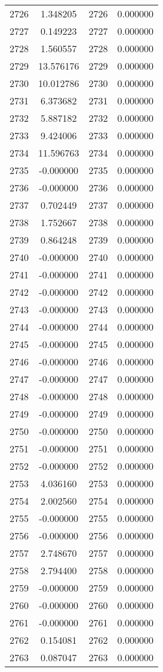 \documentclass[12pt]{article}
\begin{document}
\begin{longtable}{@{}cccc@{}}
2726 & 1.348205 & 2726 & 0.000000 \\
2727 & 0.149223 & 2727 & 0.000000 \\
2728 & 1.560557 & 2728 & 0.000000 \\
2729 & 13.576176 & 2729 & 0.000000 \\
2730 & 10.012786 & 2730 & 0.000000 \\
2731 & 6.373682 & 2731 & 0.000000 \\
2732 & 5.887182 & 2732 & 0.000000 \\
2733 & 9.424006 & 2733 & 0.000000 \\
2734 & 11.596763 & 2734 & 0.000000 \\
2735 & -0.000000 & 2735 & 0.000000 \\
2736 & -0.000000 & 2736 & 0.000000 \\
2737 & 0.702449 & 2737 & 0.000000 \\
2738 & 1.752667 & 2738 & 0.000000 \\
2739 & 0.864248 & 2739 & 0.000000 \\
2740 & -0.000000 & 2740 & 0.000000 \\
2741 & -0.000000 & 2741 & 0.000000 \\
2742 & -0.000000 & 2742 & 0.000000 \\
2743 & -0.000000 & 2743 & 0.000000 \\
2744 & -0.000000 & 2744 & 0.000000 \\
2745 & -0.000000 & 2745 & 0.000000 \\
2746 & -0.000000 & 2746 & 0.000000 \\
2747 & -0.000000 & 2747 & 0.000000 \\
2748 & -0.000000 & 2748 & 0.000000 \\
2749 & -0.000000 & 2749 & 0.000000 \\
2750 & -0.000000 & 2750 & 0.000000 \\
2751 & -0.000000 & 2751 & 0.000000 \\
2752 & -0.000000 & 2752 & 0.000000 \\
2753 & 4.036160 & 2753 & 0.000000 \\
2754 & 2.002560 & 2754 & 0.000000 \\
2755 & -0.000000 & 2755 & 0.000000 \\
2756 & -0.000000 & 2756 & 0.000000 \\
2757 & 2.748670 & 2757 & 0.000000 \\
2758 & 2.794400 & 2758 & 0.000000 \\
2759 & -0.000000 & 2759 & 0.000000 \\
2760 & -0.000000 & 2760 & 0.000000 \\
2761 & -0.000000 & 2761 & 0.000000 \\
2762 & 0.154081 & 2762 & 0.000000 \\
2763 & 0.087047 & 2763 & 0.000000 \\

\end{longtable}
\end{document}
